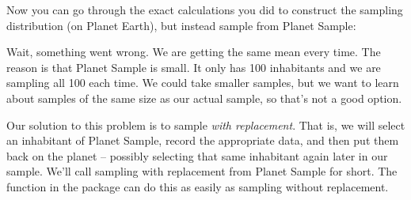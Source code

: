 Now you can go through the exact calculations you did to construct the
sampling distribution (on Planet Earth), but instead sample from 
Planet Sample:
\begin{knitrout}
\end{knitrout}




Wait, something went wrong.  We are getting the same mean every time.  The reason is that
Planet Sample is small.  It only has 100 inhabitants and we are sampling all 100 each time.
We could take smaller samples, but we want to learn about samples of the same size as 
our actual sample, so that's not a good option. 


Our solution to this problem is to sample \emph{with replacement}.  That is, we will select
an inhabitant of Planet Sample, record the appropriate data, and then put them back on the planet
-- possibly selecting that same inhabitant again later in our sample.  We'll call sampling with
replacement from Planet Sample  for short.  The  function
in the  package can do this as easily as sampling without replacement.

